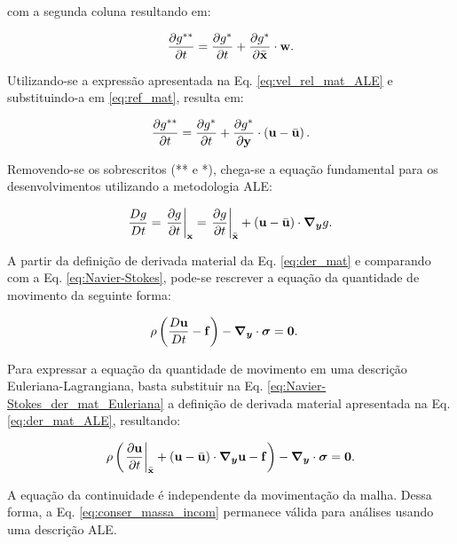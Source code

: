 \documentclass[tese_patricia]{subfiles}%
\begin{document}
\noindent com a segunda coluna resultando em:

\begin{align}
	\frac{\partial g^{**}}{\partial t} = \frac{\partial g^*}{\partial t} + \frac{\partial g^*}{\partial \bar{\mathbf{x}}} \cdot \mathbf{w}. \label{eq:ref_mat}
\end{align}

Utilizando-se a expressão apresentada na Eq. \ref{eq:vel_rel_mat_ALE} e substituindo-a em \ref{eq:ref_mat}, resulta em:

\begin{align}
	\frac{\partial g^{**}}{\partial t} = \frac{\partial g^*}{\partial t} + \frac{\partial g^*}{\partial \mathbf{y}} \cdot \left(\mathbf{u} - \bar{\mathbf{u}} \right). 
\end{align}

Removendo-se os sobrescritos (** e *), chega-se a equação fundamental para os desenvolvimentos utilizando a metodologia ALE:

\begin{align}
	\frac{Dg}{Dt} = \left . \frac{\partial g}{\partial t} \right|_{\mathbf{x}} = \left . \frac{\partial g}{\partial t} \right|_{\bar{\mathbf{x}}} + \left(\mathbf{u} - \bar{\mathbf{u}} \right) \cdot \boldsymbol{\nabla_y} g. \label{eq:der_mat_ALE}
\end{align}

A partir da definição de derivada material da Eq. \ref{eq:der_mat} e comparando com a Eq. \ref{eq:Navier-Stokes}, pode-se rescrever a equação da quantidade de movimento da seguinte forma:

\begin{align}
	\rho\left(\frac{D\mathbf{u}}{Dt} - \mathbf{f} \right) - \boldsymbol{\nabla_y} \cdot \boldsymbol{\sigma} &= \mathbf{0}. \label{eq:Navier-Stokes_der_mat_Euleriana}
\end{align}

Para expressar a equação da quantidade de movimento em uma descrição Euleriana-Lagrangiana, basta substituir na Eq. \ref{eq:Navier-Stokes_der_mat_Euleriana} a definição de derivada material apresentada na Eq. \ref{eq:der_mat_ALE}, resultando:

\begin{align}
	\rho\left(\left. \frac{\partial\mathbf{u}}{\partial t} \right|_{\bar{\mathbf{x}}} + \left(\mathbf{u} - \bar{\mathbf{u}} \right) \cdot \boldsymbol{\nabla_y}  \mathbf{u}  - \mathbf{f} \right) - \boldsymbol{\nabla_y} \cdot \boldsymbol{\sigma} = \mathbf{0}. \label{eq:Navier-Stokes_ALE} 
\end{align}

A equação da continuidade é independente da movimentação da malha. Dessa forma, a Eq. \eqref{eq:conser_massa_incom} permanece válida para análises usando uma descrição ALE.
\end{document}
